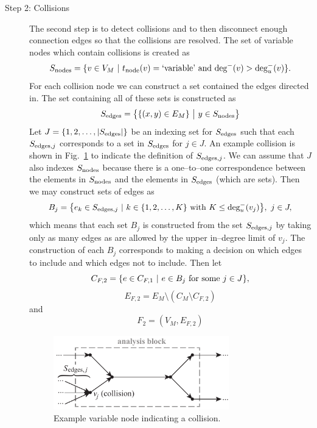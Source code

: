 \begin{description}
    \item[Step 2: Collisions] 
        The second step is to detect collisions and to then disconnect enough connection edges so that the collisions are resolved. 
        The set of variable nodes which contain collisions is created as
    \begin{equation}
    S_\textrm{nodes} = \{v \in V_M \ | \  t_\textrm{node}(v) = \textrm{`variable'} \textrm{ and } \textrm{deg}^-(v) > \textrm{deg}_u^-(v) \}.
    \end{equation}
    For each collision node we can construct a set contained the edges directed in. The set containing all of these sets is constructed as
    \begin{equation}
        S_\textrm{edges} = \big \{ \{(x,y) \in E_M\} \ \big| \ y \in S_\textrm{nodes} \big \}
    \end{equation}
    Let $J=\{1,2,\ldots,|S_\textrm{edges}|\}$ be an indexing set for $S_\textrm{edges}$ such that each $S_{\textrm{edges},j}$ corresponds to a set in $S_\textrm{edges}$ for $j \in J$. 
    An example collision is shown in Fig.~\ref{f:collision} to indicate the definition of $S_{\textrm{edges},j}$. 
    We can assume that $J$ also indexes $S_\textrm{nodes}$ because there is a one--to--one correspondence between the elements in $S_\textrm{nodes}$ and the elements in $S_\textrm{edges}$ (which are sets). 
    Then we may construct sets of edges as
    \begin{equation}
    B_j = \big \{e_k \in S_{\textrm{edges},j} \ | \  k \in \{1,2,\ldots,K\} \textrm{ with } K \leq \textrm{deg}_u^-(v_j) \big \}, \ j \in J,
    \end{equation}
        which means that each set $B_j$ is constructed from the set $S_{\textrm{edges},j}$ by taking only as many edges as are allowed by the upper in--degree limit of $v_j$. 
        The construction of each $B_j$ corresponds to making a decision on which edges to include and which edges not to include. Then let
    \begin{equation}
    C_{F,2} = \{ e \in C_{F,1} \ | \  e \in B_j \textrm{ for some } j \in J\},
    \end{equation}
    \begin{equation}
    E_{F,2} = E_M \setminus (C_M \setminus C_{F,2})
    \end{equation}
    and
    \begin{equation}
    F_2 = (V_M,E_{F,2})
    \end{equation}
    \begin{figure}[htb!]
        \begin{center}
        \includegraphics[width=3in]{images/analysis_block_collision}
        \end{center}
        \vspace{-20pt}
    \caption{Example variable node indicating a collision.}
    \label{f:collision}
    \end{figure}


\end{description}
